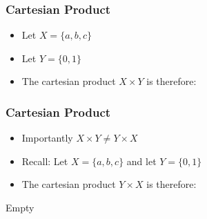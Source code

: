 \documentclass[Relations-MASTER.tex]{subfiles}
\begin{document}
\begin{frame}
\begin{frame}
\end{frame}


\begin{frame}
	\vspace{-1.9cm}
	\frametitle{Cartesian Product}
	{\LARGE
		\begin{itemize}
			\item Let $X = \{a,b,c\}$
			\item Let $Y = \{0,1\}$ 
			\item The cartesian product $X \times Y$ is therefore:
		\end{itemize}
	}
\end{frame}

\begin{frame}
	\vspace{-1.9cm}
	\frametitle{Cartesian Product}
	{\LARGE
		\begin{itemize}
			\item Importantly $X \times Y \neq Y \times X$
			\item Recall: Let $X = \{a,b,c\}$ and let $Y = \{0,1\}$ 
			\item The cartesian product $Y \times X$ is therefore:
		\end{itemize}
	}
	
	
	
\end{frame}



\begin{frame}
	Empty
\end{frame}
\end{document}
